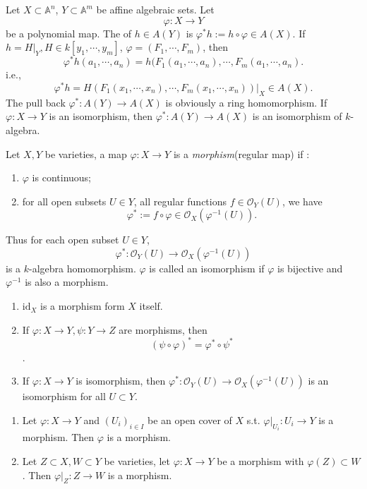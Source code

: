 \begin{definition}
	Let $ X\subset \mathbb{A}^n $, $ Y\subset \mathbb{A}^m $ be affine algebraic sets. Let
	$$
		\varphi:X\to Y
	$$
	be a polynomial map.
	The  of $ h\in A(Y) $ is $ \varphi^\ast h:=h\circ \varphi \in A(X) $. If $ h=H|_Y, H\in k[y_1,\cdots,y_m] $, $ \varphi =(F_1,\cdots,F_m) $, then
	$$
		\varphi^\ast h(a_1,\cdots,a_n)=h(F_1(a_1,\cdots,a_n),\cdots, F_m(a_1,\cdots,a_n ).
	$$
	i.e.,
	$$
		\varphi^\ast h = H( F_1(x_1,\cdots,x_n),\cdots, F_m(x_1,\cdots,x_n) )|_X\in A(X).
	$$
	The pull back $ \varphi^\ast:A(Y)\to A(X) $ is obviously a ring homomorphism. If $ \varphi:X\to Y $ is an isomorphism, then $ \varphi^\ast:A(Y)\to A(X) $ is an isomorphism of $ k $-algebra.
\end{definition}
\begin{definition}\label{11}
	Let $ X,Y $ be varieties, a map $ \varphi :X\to Y $ is a \textit{morphism}(regular map) if :\begin{enumerate}
		\item $ \varphi $ is continuous;
		\item for all open subsets $ U\in Y $, all regular functions $ f\in \mathcal{O}_Y(U) $, we have
		      $$
			      \varphi^\ast := f\circ \varphi \in \mathcal{O}_X(\varphi^{-1}(U)).
		      $$
	\end{enumerate}
\end{definition}
\begin{remark}
	Thus for each open subset $ U\in Y $,
	$$
		\varphi^\ast :\mathcal{O}_Y(U)\to \mathcal{O}_X(\varphi^{-1}(U))
	$$
	is a $ k $-algebra homomorphism. $ \varphi $ is called an isomorphism if $ \varphi $ is bijective and $ \varphi^{-1} $ is also a morphism.
	\begin{enumerate}
		\item $ \text{id}_X $ is a morphism form $ X $ itself.
		\item If $ \varphi:X\to Y,\psi :Y\to Z $ are morphisms, then
		      $$
			      (\psi\circ\varphi)^\ast = \varphi^\ast \circ \psi^\ast
		      $$.
		\item If $ \varphi : X\to Y $ is isomorphism, then $ \varphi^\ast: \mathcal{O}_Y(U)\to \mathcal{O}_X(\varphi^{-1}(U)) $ is an  isomorphism for all $ U\subset Y $.
	\end{enumerate}
\end{remark}
\begin{proposition}{}
  \noindent
	\begin{enumerate}
		\item Let $ \varphi :X\to Y $ and $ (U_i)_{i\in I} $ be an open cover of $ X $ s.t. $ \varphi |_{U_i}:U_i\to Y $ is a morphism. Then $ \varphi  $ is a morphism.
		\item Let $ Z\subset X, W\subset Y $ be varieties, let $ \varphi:X\to Y $ be a morphism with $ \varphi(Z)\subset W $. Then $ \varphi|_Z:Z\to W $ is a morphism.
	\end{enumerate}
\end{proposition}
